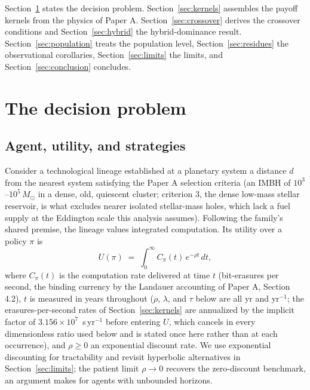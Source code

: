 \documentclass[11pt]{article}
\newcommand{\msun}{\ensuremath{M_\odot}}
\begin{document}
Section~\ref{sec:problem} states the decision problem. Section~\ref{sec:kernels} assembles the payoff kernels from the physics of Paper A. Section~\ref{sec:crossover} derives the crossover conditions and Section~\ref{sec:hybrid} the hybrid-dominance result. Section~\ref{sec:population} treats the population level, Section~\ref{sec:residues} the observational corollaries, Section~\ref{sec:limits} the limits, and Section~\ref{sec:conclusion} concludes.

\section{The decision problem}
\label{sec:problem}

\subsection{Agent, utility, and strategies}

Consider a technological lineage established at a planetary system a distance $d$ from the nearest system satisfying the Paper A selection criteria (an IMBH of $10^{3}$--$10^{5}\,\msun$ in a dense, old, quiescent cluster; criterion 3, the dense low-mass stellar reservoir, is what excludes nearer isolated stellar-mass holes, which lack a fuel supply at the Eddington scale this analysis assumes). Following the family's shared premise, the lineage values integrated computation. Its utility over a policy $\pi$ is
\begin{equation}
U(\pi) \;=\; \int_{0}^{\infty} C_{\pi}(t)\, e^{-\rho t}\, dt,
\label{eq:utility}
\end{equation}
where $C_{\pi}(t)$ is the computation rate delivered at time $t$ (bit-erasures per second, the binding currency by the Landauer accounting of Paper A, Section 4.2), $t$ is measured in years throughout ($\rho$, $\lambda$, and $\tau$ below are all yr and yr$^{-1}$; the erasures-per-second rates of Section~\ref{sec:kernels} are annualized by the implicit factor of $3.156\times10^{7}$~s\,yr$^{-1}$ before entering $U$, which cancels in every dimensionless ratio used below and is stated once here rather than at each occurrence), and $\rho \geq 0$ an exponential discount rate. We use exponential discounting for tractability and revisit hyperbolic alternatives \citep{Laibson1997} in Section~\ref{sec:limits}; the patient limit $\rho \to 0$ recovers the \citet{Ramsey1928} zero-discount benchmark, an argument \citet{Bostrom2003} makes for agents with unbounded horizons.
\end{document}
